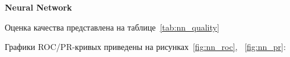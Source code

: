 \vspace{1em}
\textbf{Neural Network}

Оценка качества представлена на таблице~\ref{tab:nn_quality}

\begin{table}[h]
    \caption{Значения метрик для нейросети}
    \label{tab:nn_quality}
\end{table}

Графики ROC/PR-кривых приведены на рисунках~\ref{fig:nn_roc}, ~\ref{fig:nn_pr}:

